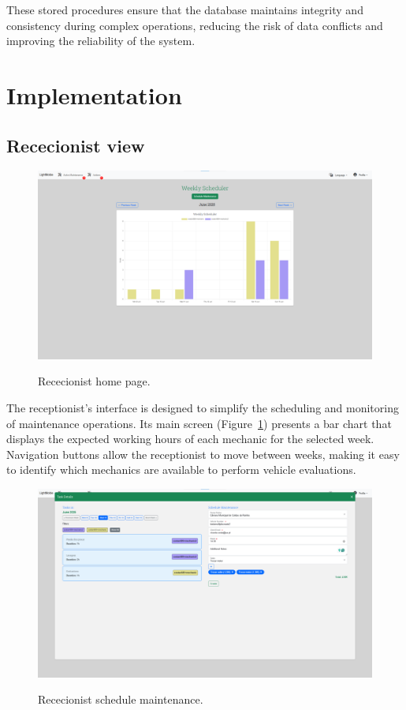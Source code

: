 These stored procedures ensure that the database maintains integrity and consistency during complex operations, reducing the risk of data conflicts and improving the reliability of the system.




\section{Implementation}

\subsection{Rececionist view}



\begin{figure}[h]
  \caption{Rececionist home page.}
  \centering
  \includegraphics[width=\textwidth]{figs/Implementation/rececionist/rececionistHomePage}
  \label{fig:impReceHome}
\end{figure}

The receptionist's interface is designed to simplify the scheduling and monitoring of maintenance operations. Its main screen (Figure~\ref{fig:impReceHome}) presents a bar chart that displays the expected working hours of each mechanic for the selected week. Navigation buttons allow the receptionist to move between weeks, making it easy to identify which mechanics are available to perform vehicle evaluations. 


\begin{figure}[h]
  \caption{Rececionist schedule maintenance.}
  \centering
  \includegraphics[width=\textwidth]{figs/Implementation/rececionist/addTask}
  \label{fig:impReceAddTask}
\end{figure}


